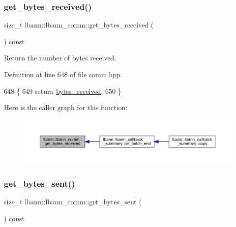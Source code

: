\subsubsection{\texorpdfstring{get\+\_\+bytes\+\_\+received()}{get\_bytes\_received()}}
{\footnotesize\ttfamily size\+\_\+t lbann\+::lbann\+\_\+comm\+::get\+\_\+bytes\+\_\+received (\begin{DoxyParamCaption}{ }\end{DoxyParamCaption}) const\hspace{0.3cm}{\ttfamily [inline]}}

Return the number of bytes received. 

Definition at line 648 of file comm.\+hpp.


\begin{DoxyCode}
648                                            \{
649     \textcolor{keywordflow}{return} \hyperlink{classlbann_1_1lbann__comm_afb99f57f7eafc0695bf28e6c26a8120f}{bytes\_received};
650   \}
\end{DoxyCode}
Here is the caller graph for this function\+:\nopagebreak
\begin{figure}[H]
\begin{center}
\leavevmode
\includegraphics[width=350pt]{classlbann_1_1lbann__comm_aadc407cd170fc9da46cdc4483f424b2a_icgraph}
\end{center}
\end{figure}
\mbox{\label{classlbann_1_1lbann__comm_afe3d3d12c544b43c478b968ef4226561}} 
\subsubsection{\texorpdfstring{get\+\_\+bytes\+\_\+sent()}{get\_bytes\_sent()}}
{\footnotesize\ttfamily size\+\_\+t lbann\+::lbann\+\_\+comm\+::get\+\_\+bytes\+\_\+sent (\begin{DoxyParamCaption}{ }\end{DoxyParamCaption}) const\hspace{0.3cm}{\ttfamily [inline]}}

